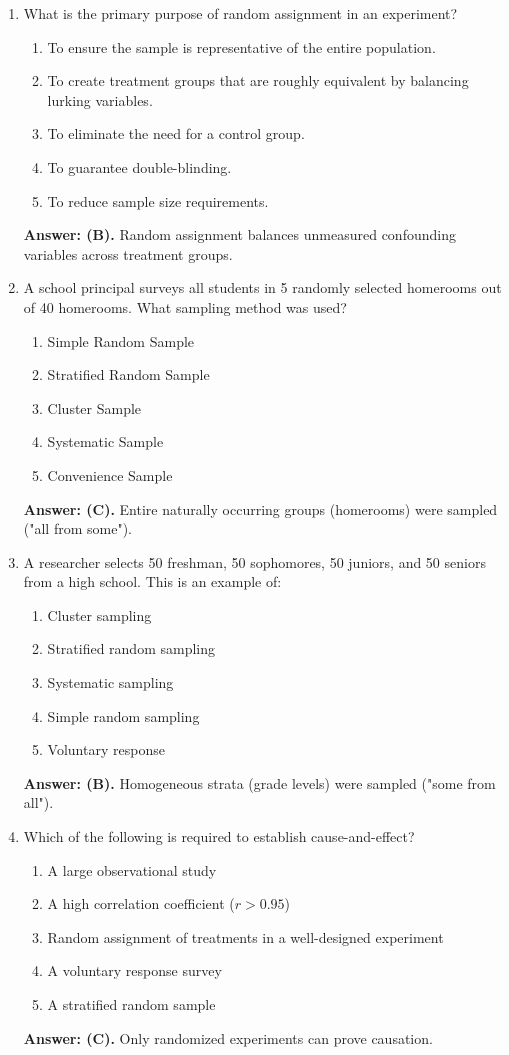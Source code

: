 \begin{enumerate}[leftmargin=1.5em]
  \item What is the primary purpose of random assignment in an experiment?
  \begin{enumerate}[label=(\Alph*)]
    \item To ensure the sample is representative of the entire population.
    \item To create treatment groups that are roughly equivalent by balancing lurking variables.
    \item To eliminate the need for a control group.
    \item To guarantee double-blinding.
    \item To reduce sample size requirements.
  \end{enumerate}
  \textbf{Answer: (B).} Random assignment balances unmeasured confounding variables across treatment groups.

  \item A school principal surveys all students in 5 randomly selected homerooms out of 40 homerooms. What sampling method was used?
  \begin{enumerate}[label=(\Alph*)]
    \item Simple Random Sample \item Stratified Random Sample \item Cluster Sample \item Systematic Sample \item Convenience Sample
  \end{enumerate}
  \textbf{Answer: (C).} Entire naturally occurring groups (homerooms) were sampled ("all from some").

  \item A researcher selects 50 freshman, 50 sophomores, 50 juniors, and 50 seniors from a high school. This is an example of:
  \begin{enumerate}[label=(\Alph*)]
    \item Cluster sampling \item Stratified random sampling \item Systematic sampling \item Simple random sampling \item Voluntary response
  \end{enumerate}
  \textbf{Answer: (B).} Homogeneous strata (grade levels) were sampled ("some from all").

  \item Which of the following is required to establish cause-and-effect?
  \begin{enumerate}[label=(\Alph*)]
    \item A large observational study \item A high correlation coefficient ($r > 0.95$) \item Random assignment of treatments in a well-designed experiment \item A voluntary response survey \item A stratified random sample
  \end{enumerate}
  \textbf{Answer: (C).} Only randomized experiments can prove causation.


\end{enumerate}
